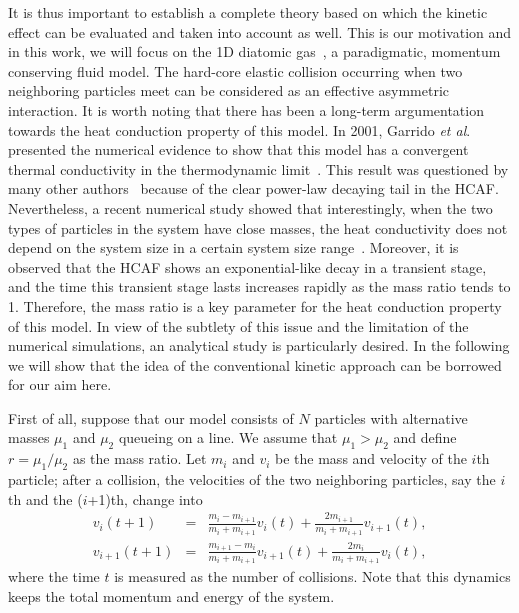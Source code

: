 \documentclass[twocolumn,secnumarabic,amssymb, nobibnotes, aps, pre,superscriptaddress]{revtex4}
\begin{document}
It is thus important to establish a complete theory based on which the kinetic effect can be evaluated and taken into account as well. This is our motivation and in this work, we will focus on the 1D diatomic gas~\cite{casatidiatom}, a paradigmatic, momentum conserving fluid model. The hard-core elastic collision occurring when two neighboring particles meet can be considered as an effective asymmetric interaction. It is worth noting that there has been a long-term argumentation towards the heat conduction property of this model. In 2001, Garrido {\it et al}. presented the numerical evidence to show that this model has a convergent thermal conductivity in the thermodynamic limit~\cite{diatom1}. This result was questioned by many other authors~\cite{dhar2, lihaibin, yang} because of the clear power-law decaying tail in the HCAF. Nevertheless, a recent numerical study showed that interestingly, when the two types of particles in the system have close masses, the heat conductivity does not depend on the system size in a certain system size range~\cite{chendiatom2}. Moreover, it is observed that the HCAF shows an exponential-like decay in a transient stage, and the time this transient stage lasts increases rapidly as the mass ratio tends to 1. Therefore, the mass ratio is a key parameter for the heat conduction property of this model. In view of the subtlety of this issue and the limitation of the numerical simulations, an analytical study is particularly desired. In the following we will show that the idea of the conventional kinetic approach can be borrowed for our aim here.


First of all, suppose that our model consists of $N$ particles with alternative masses $\mu_1$ and $\mu_2$ queueing on a line. We assume that $\mu_1>\mu_2$ and define $r=\mu_1/\mu_2$ as the mass ratio. Let $m_i$ and $v_i$ be the mass and velocity of the $i$th particle; after a collision, the velocities of the two neighboring particles, say the $i$th and the ($i$+1)th, change into
\begin{align}
    v_i(t+1)&=&\frac{m_i-m_{i+1}}{m_i+m_{i+1}}v_i(t)+\frac{2m_{i+1}}{m_i+m_{i+1}}v_{i+1}(t),\nonumber\\
    v_{i+1}(t+1)&=&\frac{m_{i+1}-m_i}{m_i+m_{i+1}}v_{i+1}(t)+\frac{2m_i}{m_i+m_{i+1}}v_{i}(t),
\end{align}
where the time $t$ is measured as the number of collisions. Note that this dynamics keeps the total momentum and energy of the system.
\end{document}
